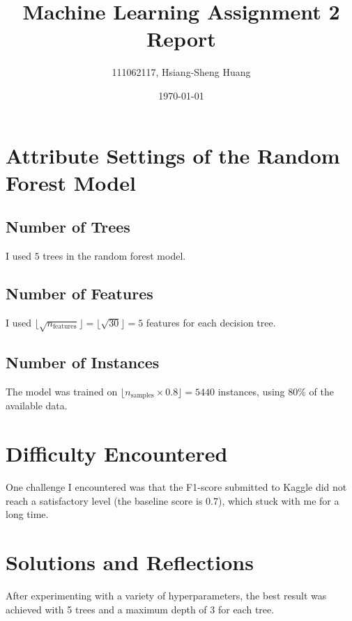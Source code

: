 \documentclass[12pt]{article}
\title{Machine Learning Assignment 2 Report}
\author{111062117, Hsiang-Sheng Huang}
\date{\today}
\begin{document}
\maketitle

\section{Attribute Settings of the Random Forest Model}
\subsection{Number of Trees}
I used $5$ trees in the random forest model.

\subsection{Number of Features}
I used $\lfloor\sqrt{n_{\text{features}}}\rfloor = \lfloor\sqrt{30}\rfloor = 5$ features for each decision tree.

\subsection{Number of Instances}
The model was trained on $\lfloor n_{\text{samples}} \times 0.8 \rfloor = 5440$ instances, using 80\% of the available data.

\section{Difficulty Encountered}
One challenge I encountered was that the F1-score submitted to Kaggle did not reach a satisfactory level (the baseline score is 0.7), which stuck with me for a long time.

\section{Solutions and Reflections}
After experimenting with a variety of hyperparameters, the best result was achieved with 5 trees and a maximum depth of 3 for each tree.
\end{document}
